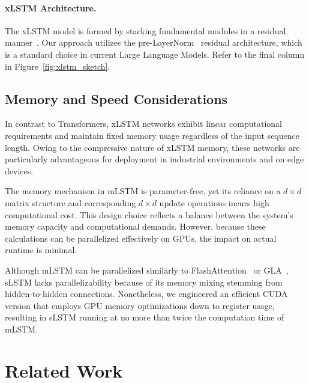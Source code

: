 \paragraph{xLSTM Architecture. }
\label{sec:xLSTMarchitecure}
The xLSTM model is formed by stacking fundamental modules in a residual manner~\citep{Srivastava:15,He:16}. Our approach utilizes the pre-LayerNorm~\citep{Ba:16b} residual architecture, which is a standard choice in current Large Language Models. Refer to the final column in Figure~\ref{fig:xlstm_sketch}.

\subsection{Memory and Speed Considerations}

In contrast to Transformers, xLSTM networks exhibit linear computational requirements and maintain fixed memory usage regardless of the input sequence length. Owing to the compressive nature of xLSTM memory, these networks are particularly advantageous for deployment in industrial environments and on edge devices.

The memory mechanism in mLSTM is parameter-free, yet its reliance on a $d \times d$ matrix structure and corresponding $d \times d$ update operations incurs high computational cost. This design choice reflects a balance between the system’s memory capacity and computational demands. However, because these calculations can be parallelized effectively on GPUs, the impact on actual runtime is minimal.

Although mLSTM can be parallelized similarly to FlashAttention~\citep{Dao:22,Dao:23} or GLA~\citep{Yang:23arxiv}, sLSTM lacks parallelizability because of its memory mixing stemming from hidden-to-hidden connections. Nonetheless, we engineered an efficient CUDA version that employs GPU memory optimizations down to register usage, resulting in sLSTM running at no more than twice the computation time of mLSTM.

\section{Related Work}
\label{sec:related}

